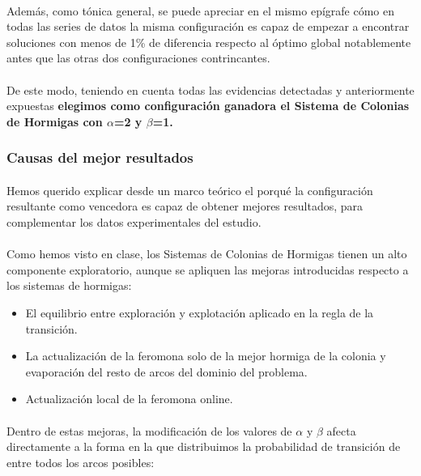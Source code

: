 	\paragraph{}Además, como tónica general, se puede apreciar en el mismo epígrafe cómo en todas las series de datos la misma configuración es capaz de empezar a encontrar soluciones con menos de 1\% de diferencia respecto al óptimo global notablemente antes que las otras dos configuraciones contrincantes.
	
	\paragraph{}De este modo, teniendo en cuenta todas las evidencias detectadas y anteriormente expuestas \textbf{elegimos como configuración ganadora el Sistema de Colonias de Hormigas con $\alpha$=2 y $\beta$=1.} 
	
	\subsubsection{Causas del mejor resultados}
	
	\paragraph{}Hemos querido explicar desde un marco teórico el porqué la configuración resultante como vencedora es capaz de obtener mejores resultados, para complementar los datos experimentales del estudio.
	
	\paragraph{}Como hemos visto en clase, los Sistemas de Colonias de Hormigas tienen un alto componente exploratorio, aunque se apliquen las mejoras introducidas respecto a los sistemas de hormigas:
	
	\begin{itemize}
		\item El equilibrio entre exploración y explotación aplicado en la regla de la transición.
		\item La actualización de la feromona solo de la mejor hormiga de la colonia y evaporación del resto de arcos del dominio del problema.
		\item Actualización local de la feromona online.
	\end{itemize}

	\paragraph{}Dentro de estas mejoras, la modificación de los valores de $\alpha$ y $\beta$ afecta directamente a la forma en la que distribuimos la probabilidad de transición de entre todos los arcos posibles:
	
